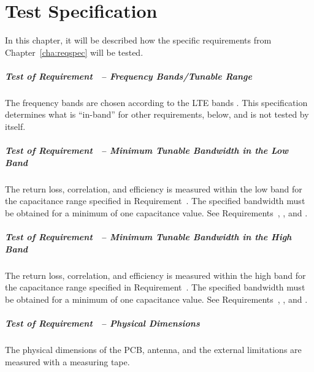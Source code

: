 \chapter{Test Specification}
\label{cha:testspec}

\begin{aautop}
    In this chapter, it will be described how the specific requirements from Chapter~\ref{cha:reqspec} will be tested.
\end{aautop}

\paragraph{Test of Requirement~ -- Frequency Bands/Tunable Range}
The frequency bands are chosen according to the LTE bands \cite{radio2015electronics}. This specification determines what is ``in-band'' for other requirements, below, and is not tested by itself.

\paragraph{Test of Requirement~ -- Minimum Tunable Bandwidth in the Low Band}
The return loss, correlation, and efficiency is measured within the low band for the capacitance range specified in Requirement~. The specified bandwidth must be obtained for a minimum of one capacitance value. See Requirements~, , and .

\paragraph{Test of Requirement~ -- Minimum Tunable Bandwidth in the High Band}
The return loss, correlation, and efficiency is measured within the high band for the capacitance range specified in Requirement~. The specified bandwidth must be obtained for a minimum of one capacitance value. See Requirements~, , and .

\paragraph{Test of Requirement~ -- Physical Dimensions}
The physical dimensions of the PCB, antenna, and the external limitations are measured with a measuring tape. 

